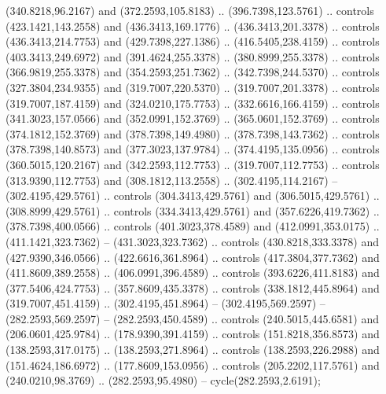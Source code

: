 {{\begin{scope}[y=-0.80pt,x=0.80pt,scale=0.04,yshift=215pt,xshift=-235pt]
      (340.8218,96.2167) and (372.2593,105.8183) .. (396.7398,123.5761) .. controls
      (423.1421,143.2558) and (436.3413,169.1776) .. (436.3413,201.3378) .. controls
      (436.3413,214.7753) and (429.7398,227.1386) .. (416.5405,238.4159) .. controls
      (403.3413,249.6972) and (391.4624,255.3378) .. (380.8999,255.3378) .. controls
      (366.9819,255.3378) and (354.2593,251.7362) .. (342.7398,244.5370) .. controls
      (327.3804,234.9355) and (319.7007,220.5370) .. (319.7007,201.3378) .. controls
      (319.7007,187.4159) and (324.0210,175.7753) .. (332.6616,166.4159) .. controls
      (341.3023,157.0566) and (352.0991,152.3769) .. (365.0601,152.3769) .. controls
      (374.1812,152.3769) and (378.7398,149.4980) .. (378.7398,143.7362) .. controls
      (378.7398,140.8573) and (377.3023,137.9784) .. (374.4195,135.0956) .. controls
      (360.5015,120.2167) and (342.2593,112.7753) .. (319.7007,112.7753) .. controls
      (313.9390,112.7753) and (308.1812,113.2558) .. (302.4195,114.2167) --
      (302.4195,429.5761) .. controls (304.3413,429.5761) and (306.5015,429.5761) ..
      (308.8999,429.5761) .. controls (334.3413,429.5761) and (357.6226,419.7362) ..
      (378.7398,400.0566) .. controls (401.3023,378.4589) and (412.0991,353.0175) ..
      (411.1421,323.7362) -- (431.3023,323.7362) .. controls (430.8218,333.3378) and
      (427.9390,346.0566) .. (422.6616,361.8964) .. controls (417.3804,377.7362) and
      (411.8609,389.2558) .. (406.0991,396.4589) .. controls (393.6226,411.8183) and
      (377.5406,424.7753) .. (357.8609,435.3378) .. controls (338.1812,445.8964) and
      (319.7007,451.4159) .. (302.4195,451.8964) -- (302.4195,569.2597) --
      (282.2593,569.2597) -- (282.2593,450.4589) .. controls (240.5015,445.6581) and
      (206.0601,425.9784) .. (178.9390,391.4159) .. controls (151.8218,356.8573) and
      (138.2593,317.0175) .. (138.2593,271.8964) .. controls (138.2593,226.2988) and
      (151.4624,186.6972) .. (177.8609,153.0956) .. controls (205.2202,117.5761) and
      (240.0210,98.3769) .. (282.2593,95.4980) -- cycle(282.2593,2.6191);
    \end{scope}
  }
}